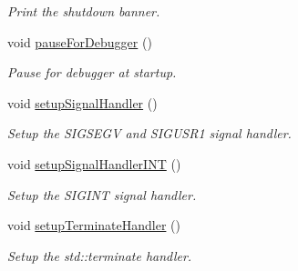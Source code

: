 \begin{DoxyCompactItemize}
\begin{DoxyCompactList}\small\item\em Print the shutdown banner. \end{DoxyCompactList}\item 
void \hyperlink{structvt_1_1runtime_1_1_runtime_afb151608d12de9a50ce037d5e8896e99}{pause\+For\+Debugger} ()
\begin{DoxyCompactList}\small\item\em Pause for debugger at startup. \end{DoxyCompactList}\item 
void \hyperlink{structvt_1_1runtime_1_1_runtime_af87ef11218f0c1d095dcdcd4cfe4521e}{setup\+Signal\+Handler} ()
\begin{DoxyCompactList}\small\item\em Setup the S\+I\+G\+S\+E\+GV and S\+I\+G\+U\+S\+R1 signal handler. \end{DoxyCompactList}\item 
void \hyperlink{structvt_1_1runtime_1_1_runtime_a382e68597ae7acb16bdb9f1c3ab4f010}{setup\+Signal\+Handler\+I\+NT} ()
\begin{DoxyCompactList}\small\item\em Setup the S\+I\+G\+I\+NT signal handler. \end{DoxyCompactList}\item 
void \hyperlink{structvt_1_1runtime_1_1_runtime_ad66c903b37209c7499ebdf53efb5f9b3}{setup\+Terminate\+Handler} ()
\begin{DoxyCompactList}\small\item\em Setup the std\+::terminate handler. \end{DoxyCompactList}\end{DoxyCompactItemize}
